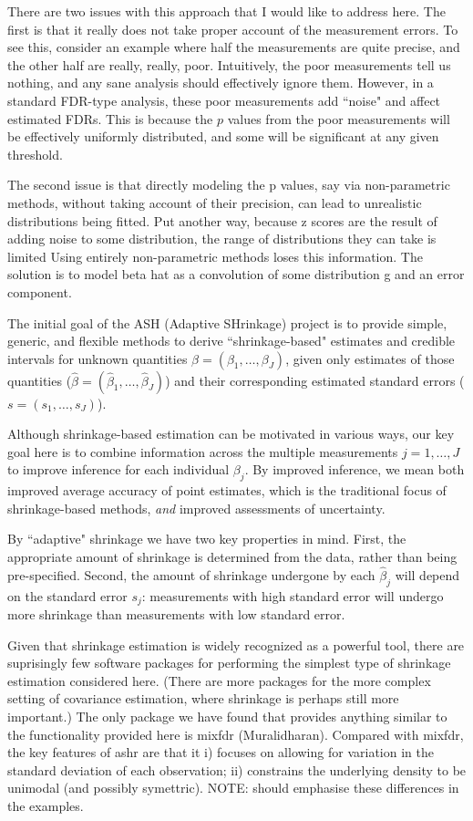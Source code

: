\documentclass[10pt]{article}
\begin{document}
There are two issues with this approach that I would like to address here. The first is that it really does not take proper account of the measurement errors. To see this, consider an example where half the measurements are quite precise, and the other half are really, really, poor. Intuitively, the poor measurements tell us nothing, and any sane analysis should effectively ignore them. However, in a standard FDR-type analysis, these poor measurements add ``noise" and affect estimated FDRs. This is because the $p$ values from the poor measurements will be effectively uniformly distributed, and some will be significant at any given threshold. 

The second issue is that directly modeling the p values, say via non-parametric methods, without taking account of their precision, 
can lead to unrealistic distributions being fitted. Put another way, because z scores are the result of adding noise to some
distribution, the range of distributions they can take is limited Using entirely non-parametric methods loses this information.
The solution is to model beta hat as a convolution of some distribution g and an error component.

The initial goal of the ASH (Adaptive SHrinkage) project is to provide simple, generic, and flexible methods to derive ``shrinkage-based" estimates and credible intervals for unknown quantities $\beta=(\beta_1,\dots,\beta_J)$, given only estimates of those quantities ($\hat\beta=(\hat\beta_1,\dots, \hat\beta_J)$) and their corresponding estimated standard errors ($s=(s_1,\dots,s_J)$). 

Although shrinkage-based estimation can be motivated in various ways, our key goal here is to combine information across the multiple measurements $j=1,\dots,J$ to improve inference for each individual $\beta_j$. By improved inference, we mean both
improved average accuracy of point estimates, which is
the traditional focus of shrinkage-based methods, \emph{and} improved assessments of uncertainty. 

By ``adaptive" shrinkage we 
have two key properties in mind. First, the appropriate amount of shrinkage is determined from the data, rather than being pre-specified. Second, the amount of shrinkage undergone by each $\hat\beta_j$ will depend on the standard error $s_j$: measurements with high standard error will undergo more shrinkage than measurements with low standard error.

Given that shrinkage estimation is widely recognized as a powerful tool, there are suprisingly few software packages for performing the simplest type of shrinkage estimation considered here. (There are more packages for the more complex setting of covariance estimation, where shrinkage is perhaps still more important.)
The only package we have found that provides anything similar
to the functionality provided here is mixfdr (Muralidharan). Compared with mixfdr, the key features of ashr are that it
i) focuses on allowing for variation in the standard deviation of each observation; ii) constrains the underlying density to be unimodal (and possibly symettric).
NOTE: should emphasise these differences in the examples.
\end{document}
